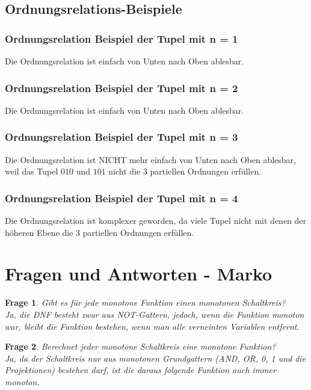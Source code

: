 \documentclass[a4paper,10pt]{article}
\newtheorem{frag}{Frage}
\begin{document}
  \subsection{Ordnungsrelations-Beispiele}
  \subsubsection{Ordnungsrelation Beispiel der Tupel mit n = 1}

      Die Ordnungsrelation ist einfach von Unten nach Oben ablesbar.


  \subsubsection{Ordnungsrelation Beispiel der Tupel mit n = 2}

      Die Ordnungsrelation ist einfach von Unten nach Oben ablesbar.

  \subsubsection{Ordnungsrelation Beispiel der Tupel mit n = 3}

      Die Ordnungsrelation ist NICHT mehr einfach von Unten nach Oben ablesbar, weil das Tupel $010$ und $101$ nicht die 3 partiellen Ordnungen erfüllen.


  \subsubsection{Ordnungsrelation Beispiel der Tupel mit n = 4}

      Die Ordnungsrelation ist komplexer geworden, da viele Tupel nicht mit denen der höheren Ebene die 3 partiellen Ordnungen erfüllen.


  \section{Fragen und Antworten - Marko}
    \begin{frag}
      Gibt es für jede monotone Funktion einen monotonen Schaltkreis? \\
      Ja, die DNF besteht zwar aus NOT-Gattern, jedoch, wenn die Funktion monoton war, bleibt die Funktion bestehen, wenn man alle verneinten Variablen entfernt.
    \end{frag}
    \begin{frag}
      Berechnet jeder monotone Schaltkreis eine monotone Funktion? \\
      Ja, da der Schaltkreis nur aus monotonen Grundgattern (AND, OR, 0, 1 und die Projektionen) bestehen darf, ist die daraus folgende Funktion auch immer monoton.
    \end{frag}
\end{document}
